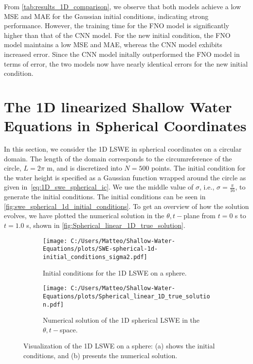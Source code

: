 From \autoref{tab:results_1D_comparison}, we observe that both models achieve a low MSE and MAE for the Gaussian initial conditions, indicating strong performance.
However, the training time for the FNO model is significantly higher than that of the CNN model.
For the new initial condition, the FNO model maintains a low MSE and MAE, whereas the CNN model exhibits increased error.
Since the CNN model initally outperformed the FNO model in terms of error, the two models now have nearly identical errors for the new initial condition.

\section{The 1D linearized Shallow Water Equations in Spherical Coordinates}
In this section, we consider the 1D LSWE in spherical coordinates on a circular domain.
The length of the domain corresponds to the circumreference of the circle, $L = 2\pi$ m, and is discretized into $N = 500$ points.
The initial condition for the water height is specified as a Gaussian function wrapped around the circle as given in~\eqref{eq:1D_swe_spherical_ic}.
We use the middle value of $\sigma$, i.e., $\sigma = \frac{\pi}{16}$, to generate the initial conditions.
The initial conditions can be seen in \autoref{fig:swe_spherical_1d_initial_conditions}.
To get an overview of how the solution evolves, we have plotted the numerical solution in the $\theta,t-$plane from $t = 0$ s to $t = 1.0$ s, shown in \autoref{fig:Spherical_linear_1D_true_solution}.
\begin{figure}[H]
    \centering
    \begin{subfigure}[t]{0.4\textwidth} %
        \centering
        \texttt{[image: C:/Users/Matteo/Shallow-Water-Equations/plots/SWE-spherical-1d-initial\_conditions\_sigma2.pdf]}
        \caption{Initial conditions for the 1D LSWE on a sphere.}\label{fig:swe_spherical_1d_initial_conditions}
    \end{subfigure}
    \hspace{0mm} %
    \begin{subfigure}[t]{0.5\textwidth} %
        \centering
        \texttt{[image: C:/Users/Matteo/Shallow-Water-Equations/plots/Spherical\_linear\_1D\_true\_solution.pdf]}
        \caption{Numerical solution of the 1D spherical LSWE in the $\theta,t-$space.}\label{fig:Spherical_linear_1D_true_solution}
    \end{subfigure}
    \caption{Visualization of the 1D LSWE on a sphere:
    (a) shows the initial conditions, and (b) presents the numerical solution.}\label{fig:LSWE_1D_sphere}
\end{figure}
